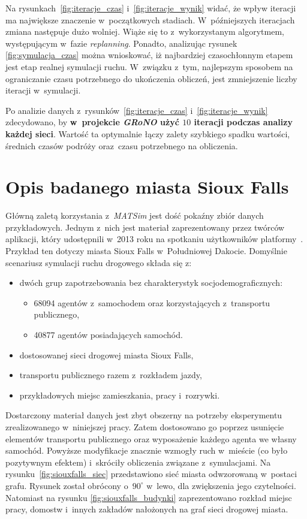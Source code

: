 \documentclass[twoside,12pt]{report}
\begin{document}
Na rysunkach~\ref{fig:iteracje_czas} i~\ref{fig:iteracje_wynik} widać, że wpływ iteracji ma największe znaczenie w~początkowych stadiach. W~późniejszych iteracjach zmiana następuje dużo wolniej. Wiąże się to z~wykorzystanym algorytmem, występującym w~fazie \textit{replanning}. Ponadto, analizując rysunek \ref{fig:symulacja_czas} można wnioskować, iż najbardziej czasochłonnym etapem jest etap realnej symulacji ruchu. W~związku z~tym, najlepszym sposobem na ograniczanie czasu potrzebnego do ukończenia obliczeń, jest zmniejszenie liczby iteracji w~symulacji.

Po analizie danych z~rysunków~\ref{fig:iteracje_czas} i~\ref{fig:iteracje_wynik} zdecydowano, by \textbf{w~projekcie \textit{GRoNO} użyć $10$ iteracji podczas analizy każdej sieci}. Wartość ta optymalnie łączy zalety szybkiego spadku wartości, średnich czasów podróży oraz~czasu potrzebnego na obliczenia. 

\section{Opis badanego miasta Sioux Falls}\label{rozdz.opis_siouxfalls}

Główną zaletą korzystania z~\textit{MATSim} jest dość pokaźny zbiór danych przykładowych. Jednym z~nich jest materiał zaprezentowany przez twórców aplikacji, który udostępnili w~2013 roku na spotkaniu użytkowników platformy~\cite{siux}. Przykład ten dotyczy miasta Sioux Falls w~Południowej Dakocie. Domyślnie scenariusz symulacji ruchu drogowego składa się z:

\begin{itemize}
\item dwóch grup zapotrzebowania bez charakterystyk socjodemograficznych:
\begin{itemize}
\item 68094 agentów z~samochodem oraz korzystających z~transportu publicznego,
\item 40877 agentów posiadających samochód.
\end{itemize}
\item dostosowanej sieci drogowej miasta Sioux Falls,
\item transportu publicznego razem z~rozkładem jazdy,
\item przykładowych miejsc zamieszkania, pracy i~rozrywki.
\end{itemize}

Dostarczony materiał danych jest zbyt obszerny na potrzeby eksperymentu zrealizowanego w~niniejszej pracy. Zatem dostosowano go poprzez usunięcie elementów transportu publicznego oraz wyposażenie każdego agenta we własny samochód. Powyższe modyfikacje znacznie wzmogły ruch w~mieście (co było pozytywnym efektem) i~skróciły obliczenia związane z~symulacjami. Na rysunku~\ref{fig:siouxfalls_siec} przedstawiono sieć miasta odwzorowaną w~postaci grafu. Rysunek został obrócony o~$90^{\circ}$ w~lewo, dla zwiększenia jego czytelności. Natomiast na rysunku \ref{fig:siouxfalls_budynki} zaprezentowano rozkład miejsc pracy, domostw i~innych zakładów nałożonych na graf sieci drogowej miasta.
\end{document}
